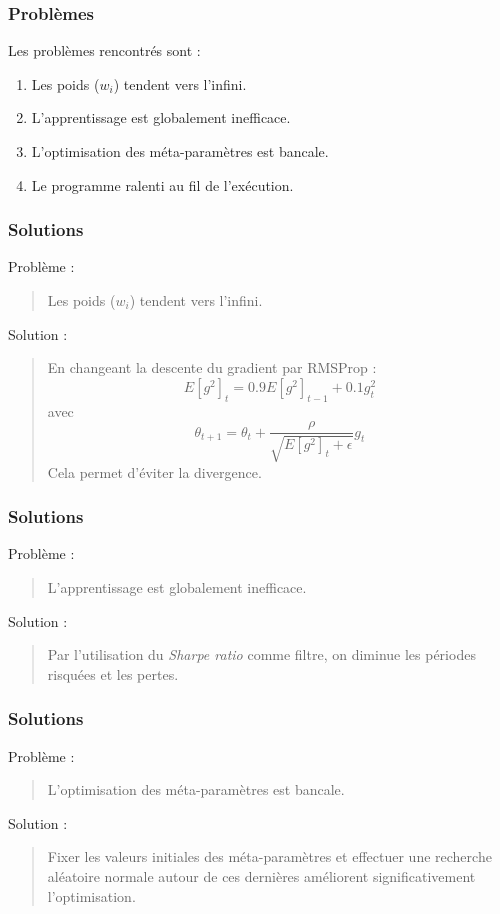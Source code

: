 \documentclass{beamer}
\begin{document}
	\begin{frame}
		\frametitle{Problèmes}
		Les problèmes rencontrés sont :
		\begin{enumerate}
			\item Les poids ($w_i$) tendent vers l'infini.
			\item L'apprentissage est globalement inefficace.
			\item L'optimisation des méta-paramètres est bancale.
			\item Le programme ralenti au fil de l'exécution.
		\end{enumerate}
	\end{frame}

	\begin{frame}
	\frametitle{Solutions}
		Problème :
		\begin{quote}
			Les poids ($w_i$) tendent vers l'infini.
		\end{quote}
	
		Solution :
		\begin{quote}
			En changeant la descente du gradient par RMSProp : $$E[g^2]_t = 0.9 E[g^2]_{t-1} + 0.1 g^2_t$$ avec $$\theta_{t+1} = \theta_t + \frac{\rho}{\sqrt{E[g^2]_t + \epsilon}} g_t$$Cela permet d'éviter la divergence.
		\end{quote}
	\end{frame}

	\begin{frame}
		\frametitle{Solutions}
		Problème :
		\begin{quote}
			 L'apprentissage est globalement inefficace.
		\end{quote}
		
		Solution :
		\begin{quote}
			Par l'utilisation du \textit{Sharpe ratio} comme filtre, on diminue les périodes risquées et les pertes.
		\end{quote}
	\end{frame}

	\begin{frame}
		\frametitle{Solutions}
		Problème :
		\begin{quote}
			L'optimisation des méta-paramètres est bancale.
		\end{quote}
		
		Solution :
		\begin{quote}
			Fixer les valeurs initiales des méta-paramètres et effectuer une recherche aléatoire normale autour de ces dernières améliorent significativement l'optimisation.
		\end{quote}
	\end{frame}
\end{document}
